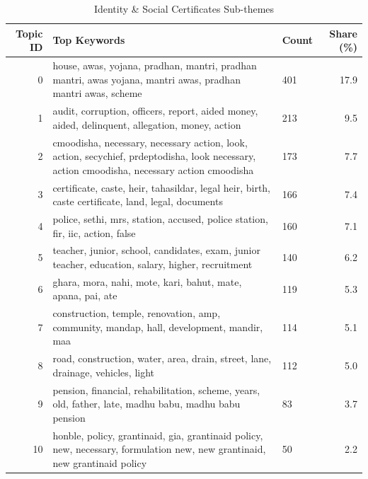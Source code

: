 \begin{table}[htbp]
\centering
\caption{Identity \& Social Certificates Sub-themes}
\label{tab:topics_Identity_Social_Certificates}
\begin{tabular}{rlp{7cm}r}
\toprule
Topic ID & Top Keywords & Count & Share (\%) \\
\midrule
0 & house, awas, yojana, pradhan, mantri, pradhan mantri, awas yojana, mantri awas, pradhan mantri awas, scheme & 401 & 17.9 \\
1 & audit, corruption, officers, report, aided money, aided, delinquent, allegation, money, action & 213 & 9.5 \\
2 & cmoodisha, necessary, necessary action, look, action, secychief, prdeptodisha, look necessary, action cmoodisha, necessary action cmoodisha & 173 & 7.7 \\
3 & certificate, caste, heir, tahasildar, legal heir, birth, caste certificate, land, legal, documents & 166 & 7.4 \\
4 & police, sethi, mrs, station, accused, police station, fir, iic, action, false & 160 & 7.1 \\
5 & teacher, junior, school, candidates, exam, junior teacher, education, salary, higher, recruitment & 140 & 6.2 \\
6 & ghara, mora, nahi, mote, kari, bahut, mate, apana, pai, ate & 119 & 5.3 \\
7 & construction, temple, renovation, amp, community, mandap, hall, development, mandir, maa & 114 & 5.1 \\
8 & road, construction, water, area, drain, street, lane, drainage, vehicles, light & 112 & 5.0 \\
9 & pension, financial, rehabilitation, scheme, years, old, father, late, madhu babu, madhu babu pension & 83 & 3.7 \\
10 & honble, policy, grantinaid, gia, grantinaid policy, new, necessary, formulation new, new grantinaid, new grantinaid policy & 50 & 2.2 \\
\bottomrule
\end{tabular}
\end{table}